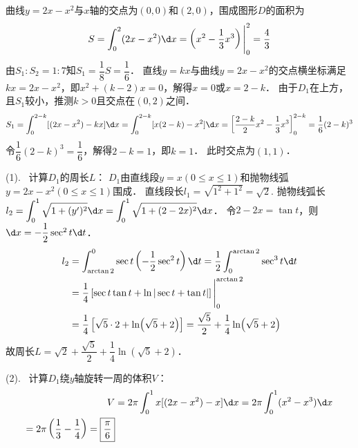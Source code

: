 \documentclass[12pt, a4paper, oneside, UTF8]{ctexbook}
\begin{document}
\begin{solution}
    曲线$y=2x-x^2$与$x$轴的交点为$(0,0)$和$(2,0)$，围成图形$D$的面积为
    \[
        S = \int_{0}^{2} (2x-x^2) \d x = \left( x^2 - \frac{1}{3}x^3 \right) \Bigg|_{0}^{2} = \frac{4}{3}
    \]
    由$S_1:S_2=1:7$知$S_1 = \dfrac{1}{8}S = \dfrac{1}{6}$．
    直线$y=kx$与曲线$y=2x-x^2$的交点横坐标满足$kx = 2x-x^2$，即$x^2 + (k-2)x = 0$，解得$x=0$或$x=2-k$．
    由于$D_1$在上方，且$S_1$较小，推测$k>0$且交点在$(0,2)$之间．
    \[
        S_1 = \int_{0}^{2-k} [(2x-x^2) - kx] \d x = \int_{0}^{2-k} [x(2-k) - x^2] \d x
        = \left[ \frac{2-k}{2}x^2 - \frac{1}{3}x^3 \right]_{0}^{2-k}
        = \frac{1}{6}(2-k)^3
    \]
    令$\dfrac{1}{6}(2-k)^3 = \dfrac{1}{6}$，解得$2-k=1$，即$k=1$．
    此时交点为$(1,1)$．
    
    (1).~ 计算$D_1$的周长$L$：
    $D_1$由直线段$y=x (0 \le x \le 1)$和抛物线弧$y=2x-x^2 (0 \le x \le 1)$围成．
    直线段长$l_1 = \sqrt{1^2+1^2} = \sqrt{2}$.
    抛物线弧长$\displaystyle l_2 = \int_{0}^{1} \sqrt{1+(y')^2} \d x = \int_{0}^{1} \sqrt{1+(2-2x)^2} \d x$．
    令$2-2x = \tan t$，则$\d x = -\dfrac{1}{2}\sec^2 t \d t$．
    \begin{align*}
        l_2 &= \int_{\arctan 2}^{0} \sec t \left( -\frac{1}{2}\sec^2 t \right) \d t
        = \frac{1}{2} \int_{0}^{\arctan 2} \sec^3 t \d t \\
        &= \frac{1}{4} \left[\sec t \tan t + \ln |\sec t + \tan t|\right] \Bigg|_{0}^{\arctan 2} \\
        &= \frac{1}{4} \left[\sqrt{5} \cdot 2 + \ln(\sqrt{5}+2)\right] = \frac{\sqrt{5}}{2} + \frac{1}{4}\ln(\sqrt{5}+2)
    \end{align*}
    故周长$L = \boxed{\sqrt{2} + \dfrac{\sqrt{5}}{2} + \dfrac{1}{4}\ln(\sqrt{5}+2)}$．

    (2).~ 计算$D_1$绕$y$轴旋转一周的体积$V$：
    \begin{align*}
        V &= 2\pi \int_{0}^{1} x [(2x-x^2) - x] \d x
        = 2\pi \int_{0}^{1} (x^2 - x^3) \d x \\
        = 2\pi \left( \frac{1}{3} - \frac{1}{4} \right) = \boxed{\frac{\pi}{6}}
    \end{align*}
\end{solution}
\ifx\allfiles\undefined
\end{document}
